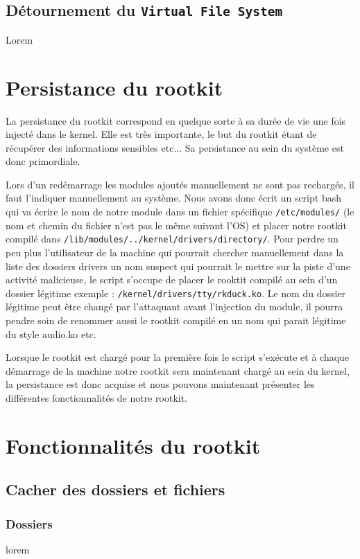 \documentclass[11pt]{article}
\begin{document}
	\subsection{ Détournement du \texttt{Virtual File System}}
	Lorem
\section{Persistance du rootkit}
	
	La persistance du rootkit correspond en quelque sorte à sa durée de vie une fois injecté dans le kernel. Elle est très importante, le but du rootkit étant de récupérer des informations sensibles etc... Sa persistance au sein du système est donc primordiale. 
	
	Lors d'un redémarrage les modules ajoutés manuellement ne sont pas rechargés, il faut l'indiquer manuellement au système. Nous avons donc écrit un script bash qui va écrire le nom de notre module dans un fichier spécifique \texttt{/etc/modules/} (le nom et chemin du fichier n'est pas le même suivant l'OS) et placer notre rootkit compilé dans \texttt{/lib/modules/../kernel/drivers/directory/}. Pour perdre un peu plus l'utilisateur de la machine qui pourrait chercher manuellement dans la liste des dossiers drivers un nom suspect qui pourrait le mettre sur la piste d'une activité malicieuse, le script s'occupe de placer le rooktit compilé au sein d'un dossier légitime exemple : \texttt{/kernel/drivers/tty/rkduck.ko}. Le nom du dossier légitime peut être changé par l'attaquant avant l'injection du module, il pourra pendre soin de renommer aussi le rootkit compilé en un nom qui parait légitime du style audio.ko etc.
	
	Lorsque le rootkit est chargé pour la première fois le script s'exécute et à chaque démarrage de la machine notre rootkit sera maintenant chargé au sein du kernel, la persistance est donc acquise et nous pouvons maintenant présenter les différentes fonctionnalités de notre rootkit.
	
\section{Fonctionnalités du rootkit}
	
	\subsection{Cacher des dossiers et fichiers}
	
		\subsubsection{Dossiers}
			lorem
\end{document}
